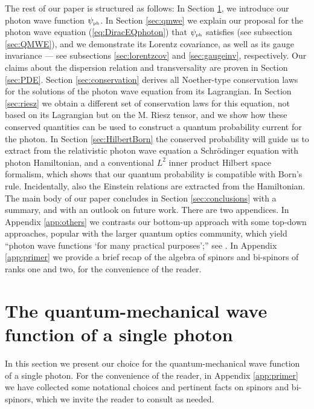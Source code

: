 \documentclass[11pt]{article}
\theoremstyle{definition}
\newcommand{\refeq}[1]{(\ref{#1})}
\numberwithin{equation}{section}
\newcommand{\psiPH}{{\psi_{\mbox{\rm\tiny ph}}}}
\begin{document}
 The rest of our paper is structured as follows:
 In Section \ref{sec:PSIphoton}, we introduce our photon wave function $\psiPH$.
 In Section \ref{sec:qmwe} we explain our proposal for the photon wave equation \refeq{eq:DiracEQphoton} 
that $\psiPH$ satisfies (see subsection \ref{sec:QMWE}), and we demonstrate its Lorentz covariance, as well as its gauge invariance ---
see subsections \ref{sec:lorentzcov} and \ref{sec:gaugeinv}, respectively. 
  Our claims about the dispersion relation and transversality are proven in Section \ref{sec:PDE}.  
 Section \ref{sec:conservation} derives all Noether-type conservation laws for the solutions of the photon wave equation from 
its Lagrangian.
  In Section \ref{sec:riesz} we obtain a different set of conservation laws for this equation, not based on its Lagrangian but
on the M. Riesz tensor, and we show how these conserved quantities can be used to construct a quantum probability current for the 
photon.
 In Section \ref{sec:HilbertBorn} the conserved probability will guide us to extract from the relativistic 
photon wave equation a Schr\"odinger equation with photon Hamiltonian, and a conventional $L^2$ inner product Hilbert space formalism,
which shows that our quantum probability is  compatible with Born's rule.  
 Incidentally, also the Einstein relations are extracted from the Hamiltonian.
 The main body of our paper concludes in Section \ref{sec:conclusions} with a summary, and with an outlook on future work.
 There are two appendices. 
 In Appendix \ref{app:others} we contrasts our bottom-up approach with some top-down approaches, popular with the larger 
quantum optics community, which yield ``photon wave functions `for many practical purposes';'' 
see \cite{IBBphotonREV, ScullyBOOK, SmithRaymer, Chandrasekar, Hawton, Mostafazadeh}.
 In Appendix \ref{app:primer} we provide a brief recap of the algebra of spinors and bi-spinors of ranks one and two, 
 for the convenience of the reader. 

\section{The quantum-mechanical wave function of a single photon}\label{sec:PSIphoton}
 In this section we present our choice for the quantum-mechanical wave function of a single photon. 
 For the convenience of the reader, in Appendix \ref{app:primer} we have collected some notational 
choices and pertinent facts on spinors and bi-spinors, which we invite the reader to consult as needed.
\end{document}
